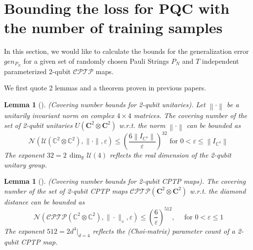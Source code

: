 \documentclass[%
 reprint,
superscriptaddress,
 amsmath,amssymb,
 aps,
]{revtex4-2}
\newcommand{\norm}[1]{\left\lVert#1\right\rVert}
\newtheorem{lemma}[theorem]{Lemma}
\begin{document}
\section{Bounding the loss for PQC with the number of training samples}
\label{sec:Theoretical_Bounds}
In this section, we would like to calculate the bounds for the generalization error $gen_{P_N}$ for a given set of randomly chosen Pauli Strings $P_N$ and $T$ independent parameterized 2-qubit $\mathcal{CPTP}$ maps.

We first quote 2 lemmas and a theorem proven in previous papers.

\begin{lemma}[\!\!\cite{caro2022generalization}]
    (Covering number bounds for 2-qubit unitaries). Let $\norm{\cdot}$ be a unitarily invariant norm on complex $4 \times 4$ matrices. The covering number of the set of 2-qubit unitaries $U(\mathbf{C}^2 \otimes \mathbf{C}^2)$ w.r.t. the norm $\norm{\cdot}$ can be bounded as
\begin{equation}
    \mathcal{N}\left(\mathcal{U}\left(\mathbb{C}^2 \otimes \mathbb{C}^2\right),\|\cdot\|, \varepsilon\right) \leqslant\left(\frac{6\left\|I_{\mathbb{C}^4}\right\|}{\varepsilon}\right)^{32}
    \text { for } 0<\varepsilon \leqslant\left\|I_{\mathbb{C}^4}\right\|
\end{equation}
The exponent $32 = 2\,\dim_{\mathbb{R}}\mathcal{U}(4)$ reflects the real dimension of the 2-qubit unitary group.
\end{lemma}

\begin{lemma}[\!\!\cite{caro2022generalization}]
    (Covering number bounds for 2-qubit CPTP maps). The covering number of the set of 2-qubit CPTP maps $\mathcal{CPTP}(\mathbf{C}^2 \otimes \mathbf{C}^2)$ w.r.t. the diamond distance can be bounded as
    \begin{equation}
    \mathcal{N}\left(\mathcal{CPTP}\left(\mathbb{C}^2 \otimes \mathbb{C}^2\right),\|\cdot\|_\diamond, \varepsilon\right) \leqslant\left(\frac{6}{\varepsilon}\right)^{512}, \quad \text { for } 0<\varepsilon \leqslant1
    \end{equation}
The exponent $512 = 2 d^{4}\big|_{d=4}$ reflects the (Choi-matrix) parameter count of a 2-qubit CPTP map.
\end{lemma}
\end{document}

